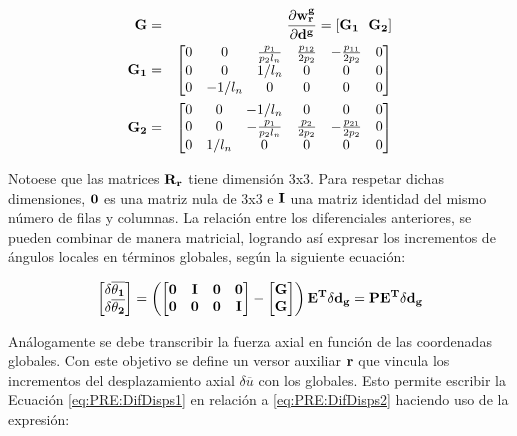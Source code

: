 \begin{eqnarray}\label{Eqn:PRE:Corrot:DefG}
		\bf{G}&=&\frac{\partial \bf{w_r^g}}{\partial \bf{d}^g}=[\bf{G}_1 ~~ \bf{G}_2]\\
		\bf{G}_1&=&\begin{bmatrix}
			0 &  0      &  \frac{p_1}{p_2 l_n} &  \frac{p_{12}}{2p_2} &-\frac{p_{11}}{2p_2}  &  0  \\
			0 &  0      &   1/l_n   &       0       &      0       &  0   \\
			0 & -1/l_n  &      0    &       0       &      0       &  0
		\end{bmatrix}\\
		\bf{G}_2&=&\begin{bmatrix}
			0  &  0    &   -1/l_n   &      0      &     0        &    0 \\
			0  &  0     &-\frac{p_1}{p_2 l_n}  & \frac{p_{2}}{2p_2} &-\frac{p_{21}}{2p_2} &    0 \\
			0  &  1/l_n &       0   &      0      &     0        &    0
		\end{bmatrix}
\end{eqnarray}

Notoese que las matrices $\bf{R}_r$ tiene dimensión 3x3. Para respetar dichas dimensiones, $\bf{0}$ es una matriz nula de 3x3 e $\bf{I}$ una matriz identidad del mismo número de filas y columnas. La relación entre los diferenciales anteriores, se pueden combinar de manera matricial, logrando así expresar los incrementos de ángulos locales en términos globales, según la siguiente ecuación:

\begin{equation}\label{Eqn:RPE:IncrementosAngulos}
	\begin{bmatrix}
		\bf{\delta\overline{\theta_1}}\\
		\bf{\delta\overline{\theta_2}}
	\end{bmatrix}=\left ( \begin{bmatrix}
		\bf{0} &\bf{I}  & \bf{0} &\bf{0} \\
		\bf{0}&\bf{0}  &\bf{0}  & \bf{I}
	\end{bmatrix}-\begin{bmatrix}
		\bf{G}\\
		\bf{G}
	\end{bmatrix} \right )\bf{E}^T \delta \bf{d_g}=\bf{P}\bf{E}^T \delta \bf{d_g}
\end{equation}

Análogamente se debe transcribir la fuerza axial en función de las coordenadas globales. Con este objetivo se define un versor auxiliar  $ \bf{r}$ que vincula los incrementos del desplazamiento axial $\delta \overline{u}$ con los globales. Esto permite escribir la Ecuación \eqref{eq:PRE:DifDisps1} en relación a  \eqref{eq:PRE:DifDisps2} haciendo uso de la expresión:

